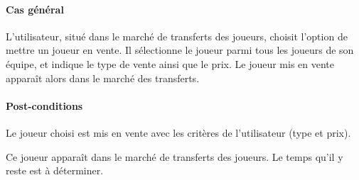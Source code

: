 \paragraph{Cas général}
L'utilisateur, situé dans le marché de transferts des joueurs, choisit l'option de mettre un joueur en vente. Il sélectionne le joueur parmi tous les joueurs de son équipe, et indique le type de vente ainsi que le prix. Le joueur mis en vente apparaît alors dans le marché des transferts.
\paragraph{Post-conditions}
\begin{list}{}{\leftmargin=1.5em}
\item{Le joueur choisi est mis en vente avec les critères de l'utilisateur (type et prix).}
\item{Ce joueur apparaît dans le marché de transferts des joueurs. Le temps qu'il y reste est à déterminer.}
\end{list}

